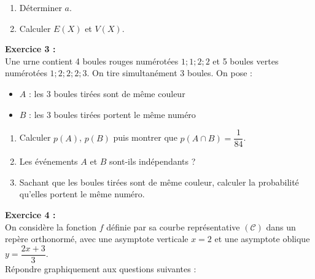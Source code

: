 \begin{enumerate}[leftmargin=1.5em, label=\textbf{\arabic*.}, itemsep=2pt, topsep=4pt]
  \item D\'{e}terminer $a$.
  \item Calculer $E(X)$ et $V(X)$.
\end{enumerate}

\medskip

\noindent\textbf{Exercice 3 :}\\
Une urne contient 4 boules rouges num\'{e}rot\'{e}es $1;1;2;2$
et 5 boules vertes num\'{e}rot\'{e}es $1;2;2;2;3$.
On tire simultan\'{e}ment 3 boules. On pose :
\begin{itemize}[itemsep=0pt, topsep=2pt, leftmargin=2em]
  \item $A$ : \guillemotleft{} les 3 boules tir\'{e}es sont de m\^{e}me couleur \guillemotright{}
  \item $B$ : \guillemotleft{} les 3 boules tir\'{e}es portent le m\^{e}me num\'{e}ro \guillemotright{}
\end{itemize}

\begin{enumerate}[leftmargin=1.5em, label=\textbf{\arabic*.}, itemsep=2pt, topsep=4pt]
  \item Calculer $p(A)$, $p(B)$ puis montrer que $p(A \cap B) = \dfrac{1}{84}$.
  \item Les \'{e}v\'{e}nements $A$ et $B$ sont-ils ind\'{e}pendants ?
  \item Sachant que les boules tir\'{e}es sont de m\^{e}me couleur,
        calculer la probabilit\'{e} qu'elles portent le m\^{e}me num\'{e}ro.
\end{enumerate}

\medskip

\noindent\textbf{Exercice 4 :}\\
On consid\`{e}re la fonction $f$ d\'{e}finie par sa courbe repr\'{e}sentative $(\mathcal{C})$
dans un rep\`{e}re orthonorm\'{e}, avec une asymptote verticale $x = 2$
et une asymptote oblique $y = \dfrac{2x+3}{3}$.\\
R\'{e}pondre graphiquement aux questions suivantes :

